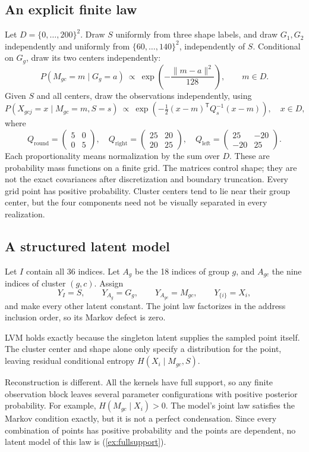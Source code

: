 \documentclass[11pt]{article}
\begin{document}
\subsection{An explicit finite law}
Let $D=\{0,\ldots,200\}^2$. Draw $S$ uniformly from three shape labels, and
draw $G_1,G_2$ independently and uniformly from $\{60,\ldots,140\}^2$,
independently of $S$. Conditional on $G_g$, draw its two centers independently:
\[
 P(M_{gc}=m\mid G_g=a)\ \propto\
 \exp\!\left(-\frac{\|m-a\|^2}{128}\right),\qquad m\in D.
\]
Given $S$ and all centers, draw the observations independently, using
\[
 P(X_{gcj}=x\mid M_{gc}=m,S=s)\ \propto\
 \exp\!\left(-\tfrac12(x-m)^\mathsf{T}Q_s^{-1}(x-m)\right),\quad x\in D,
\]
where
\[
 Q_{\mathrm{round}}=\begin{pmatrix}5&0\\0&5\end{pmatrix},\quad
 Q_{\mathrm{right}}=\begin{pmatrix}25&20\\20&25\end{pmatrix},\quad
 Q_{\mathrm{left}}=\begin{pmatrix}25&-20\\-20&25\end{pmatrix}.
\]
Each proportionality means normalization by the sum over $D$. These are
probability mass functions on a finite grid. The matrices control shape; they
are not the exact covariances after discretization and boundary truncation.
Every grid point has positive probability. Cluster centers tend to lie near
their group center, but the four components need not be visually separated in
every realization.

\subsection{A structured latent model}
Let $I$ contain all 36 indices. Let $A_g$ be the 18 indices of group $g$, and
$A_{gc}$ the nine indices of cluster $(g,c)$. Assign
\[
 Y_I=S,\qquad Y_{A_g}=G_g,\qquad Y_{A_{gc}}=M_{gc},\qquad
 Y_{\{i\}}=X_i,
\]
and make every other latent constant. The joint law factorizes in the address
inclusion order, so its Markov defect is zero.

LVM holds exactly because the singleton latent supplies the sampled point
itself. The cluster center and shape alone only specify a distribution for the
point, leaving residual conditional entropy $H(X_i\mid M_{gc},S)$.

Reconstruction is different. All the kernels have full support, so any
finite observation block leaves several parameter configurations with positive
posterior probability. For example, $H(M_{gc}\mid X_i)>0$. The model's joint
law satisfies the Markov condition exactly, but it is not a perfect condensation.
Since every combination of points has positive probability and the points are
dependent, no latent model of this law is (\cref{ex:fullsupport}).
\end{document}
